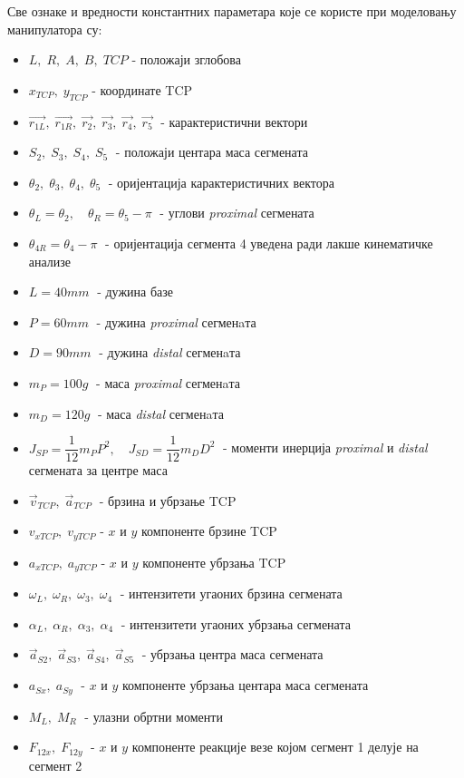 \documentclass[12pt]{article}
\begin{document}
Све ознаке и вредности константних параметара које се користе при моделовању манипулатора су:
\begin{itemize}
    \item $L,\; R,\; A,\; B,\; TCP$ - положаји зглобова
    \item $x_{TCP},\;y_{TCP}$ - координате TCP
    \item $\vec{r_{1L}},\; \vec{r_{1R}},\; \vec{r_{2}},\; \vec{r_{3}},\; \vec{r_{4}}, \;\vec{r_{5}}\;$ - карактеристични вектори
    \item $S_2,\; S_3,\; S_4,\; S_5\;$ - положаји центара маса сегмената
    \item $\theta_2,\; \theta_3,\; \theta_4,\; \theta_5\;$ - оријентација карактеристичних вектора
    \item $\theta_L = \theta_2, \quad \theta_R = \theta_5-\pi\;$ - углови \textit{proximal} сегмената
    \item $\theta_{4R} = \theta_4-\pi\;$ - оријентација сегмента 4 уведена ради лакше кинематичке анализе
    \item $L = 40mm\;$ - дужина базе
    \item $P = 60mm\;$ - дужина \textit{proximal} сегменaта
    \item $D = 90mm\;$ - дужина \textit{distal} сегменaта
    \item $m_P = 100g\;$ - маса \textit{proximal} сегменaта
    \item $m_D = 120g\;$ - маса \textit{distal} сегменaта
    \item $J_{SP} = \dfrac{1}{12} m_P P ^ 2,\quad J_{SD} = \dfrac{1}{12} m_D D ^ 2\;$ - моменти инерција \textit{proximal} и \textit{distal} сегмената за центре маса
    \item $\vec{v}_{TCP},\; \vec{a}_{TCP}\;$ - брзина и убрзање TCP
    \item $v_{xTCP},\;v_{yTCP}$ - $x$ и $y$ компоненте брзине  TCP
    \item $a_{xTCP},\;a_{yTCP}$ - $x$ и $y$ компоненте убрзања TCP
    \item $\omega_L,\; \omega_R,\; \omega_3,\; \omega_4\;$ - интензитети угаоних брзина сегмената
    \item $\alpha_L,\; \alpha_R,\; \alpha_3,\; \alpha_4\;$ - интензитети угаоних убрзања сегмената
    \item $\vec{a}_{S2},\; \vec{a}_{S3},\; \vec{a}_{S4},\; \vec{a}_{S5}\;$ - убрзања центра маса сегмената
    \item $a_{Sx},\; a_{Sy}\;$ - $x$ и $y$ компоненте убрзања центара маса сегмената
    \item $M_L,\;M_R\;$ - улазни обртни моменти
    \item $F_{12x},\; F_{12y}\;$ - $x$ и $y$ компоненте реакције везе којом сегмент 1 делује на сегмент 2
\end{itemize}
\end{document}
